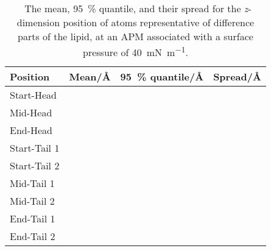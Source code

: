 %
%
\begin{table}
\centering
\small
  \caption{\ The mean, \SI{95}{\percent} quantile, and their spread for the \emph{z}-dimension position of atoms representative of difference parts of the lipid, at an APM associated with a surface pressure of \SI{40}{\milli\newton\per\meter}.}
  \label{tab:spread3}
  \begin{tabular}{llll}
    \hline
    Position & Mean/\si{\angstrom} & \SI{95}{\percent} quantile/\si{\angstrom} & Spread/\si{\angstrom} \\
    \hline
    Start-Head &  &  &  \\
    Mid-Head &  &  &  \\
    End-Head &  &  &  \\
    \hline
    Start-Tail 1 &  &  &  \\
    Start-Tail 2 &  &  &  \\
    Mid-Tail 1 &  &  &  \\
    Mid-Tail 2 &  &  &  \\
    End-Tail 1 &  &  &  \\
    End-Tail 2 &  &  &  \\
    \hline
  \end{tabular}
\end{table}
